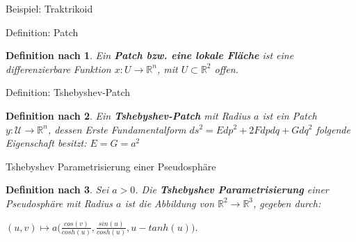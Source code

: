 \documentclass[12pt]{beamer}
\newtheorem{mydef}{Definition nach \cite{gray}}
\begin{document}
\begin{frame}{Beispiel: Traktrikoid}
\begin{figure}
\end{figure}

\end{frame}

\begin{frame}{Definition: Patch}
\begin{mydef}
Ein \textbf{Patch bzw. eine lokale Fläche} ist eine differenzierbare Funktion $x: U \rightarrow \mathbb{R}^n$, mit $U \subset \mathbb{R}^2$ offen. 
\end{mydef}
\end{frame}

\begin{frame}{Definition: Tshebyshev-Patch}
\begin{mydef}
Ein \textbf{Tshebyshev-Patch} mit Radius $a$ ist ein Patch $y: \mathcal{U}\rightarrow \mathbb{R}^n$, dessen Erste Fundamentalform $ds^2 = Edp^2 + 2Fdpdq + Gdq^2$ folgende Eigenschaft besitzt:\newline
$E = G = a^2$
\end{mydef}
\end{frame}

\begin{frame}{Tshebyshev Parametrisierung einer Pseudosphäre}
\begin{mydef}
Sei $a > 0$. Die \textbf{Tshebyshev Parametrisierung} einer Pseudosphäre mit Radius $a$ ist die Abbildung von $\mathbb{R}^2 \rightarrow \mathbb{R}^3$, gegeben durch:
\begin{center}
$(u,v) \mapsto a\Big(\frac{cos(v)}{cosh(u)}, \frac{sin(u)}{cosh(u)}, u - tanh(u)\Big)$.
\end{center}
\end{mydef}
\end{frame}
\end{document}
